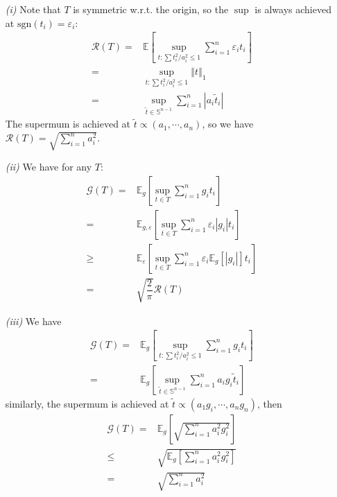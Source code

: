 \documentclass[11pt,a4paper]{ctexart}
\numberwithin{equation}{section}%
\begin{document}
\begin{itemize}[topsep=2pt,itemsep=0pt]
    \item[\textit{(i)}] Note that $ T $ is symmetric w.r.t. the origin, so the $ \sup $ is always achieved at $ \mathrm{ sgn }(t_i)=\varepsilon _i  $:
    \begin{align*}
        \mathcal{R}(T)= & \mathbb{E}\left[ \mathop{ \sup  }\limits_{t: \sum t_i^2/a_i^2\leq 1} \sum_{i=1}^n\varepsilon _it_i  \right]  \\
        =& \mathop{ \sup  }\limits_{t: \sum t_i^2/a_i^2\leq 1} \left\Vert t  \right\Vert _1 \\
        =& \mathop{ \sup }\limits_{\tilde{t}\in\mathbb{S}^{n-1}} \sum_{i=1}^n \left\vert  a_i\tilde{t}_i \right\vert   
    \end{align*}
    The supermum is achieved at $ \tilde{t} \propto (a_1,\cdots,a_n) $, so we have $ \mathcal{R}(T) = \sqrt{\sum_{i=1}^n a_i^2} $.
    \item[\textit{(ii)}] We have for any $ T $:
    \begin{align*}
        \mathcal{G}(T)= & \mathbb{E}_g\left[ \mathop{ \sup  }\limits_{t\in T} \sum_{i=1}^n g_it_i  \right]  \\
        =& \mathbb{E}_{g,\varepsilon }\left[ \mathop{ \sup  }\limits_{t\in T} \sum_{i=1}^n\varepsilon _i\left\vert g_i \right\vert  t_i  \right]  \\
        \geq &\mathbb{E}_\varepsilon \left[  \mathop{ \sup  }\limits_{t\in T} \sum_{i=1}^n\varepsilon _i \mathbb{E}_g\left[ \left\vert g_i \right\vert \right]   t_i   \right] \\
        =& \sqrt{\dfrac{ 2 }{ \pi  }}\mathcal{R}(T)
    \end{align*}
    \item[\textit{(iii)}] We have
    \begin{align*}
        \mathcal{G}(T)= & \mathbb{E}_g\left[ \mathop{ \sup  }\limits_{t: \sum t_i^2/a_i^2\leq 1} \sum_{i=1}^n g_it_i  \right]  \\
        =& \mathbb{E}_g\left[ \mathop{ \sup }\limits_{\tilde{t}\in\mathbb{S}^{n-1}} \sum_{i=1}^n  a_ig_i\tilde{t}_i   \right]  
    \end{align*}
    similarly, the supermum is achieved at $ \tilde{t} \propto (a_1g_i,\cdots,a_ng_n) $, then
    \begin{align*}
        \mathcal{G}(T) = & \mathbb{E}_g\left[ \sqrt{\sum_{i=1}^n a_i^2g_i^2} \right] \\
        \leq & \sqrt{\mathbb{E}_g\left[ \sum_{i=1}^n a_i^2g_i^2 \right] } \\
        = & \sqrt{\sum_{i=1}^n a_i^2}
    \end{align*}
    
    
\end{itemize}
\end{document}
